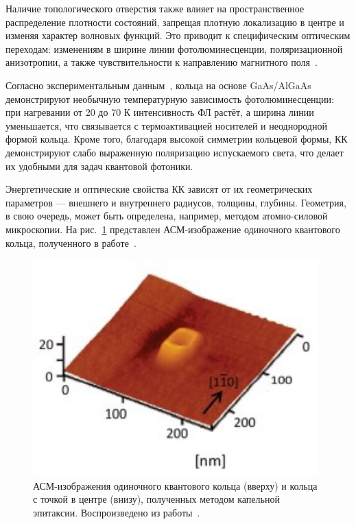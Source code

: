 \documentclass[14pt,oneside]{extarticle}
\begin{document}
Наличие топологического отверстия также влияет на пространственное распределение плотности состояний, запрещая плотную локализацию в центре и изменяя характер волновых функций. Это приводит к специфическим оптическим переходам: изменениям в ширине линии фотолюминесценции, поляризационной анизотропии, а также чувствительности к направлению магнитного поля~\cite{Beo2020}.

Согласно экспериментальным данным~\cite{sibirmovskiy2018}, кольца на основе GaAs/AlGaAs демонстрируют необычную температурную зависимость фотолюминесценции: при нагревании от 20 до 70 К интенсивность ФЛ растёт, а ширина линии уменьшается, что связывается с термоактивацией носителей и неоднородной формой кольца. Кроме того, благодаря высокой симметрии кольцевой формы, КК демонстрируют слабо выраженную поляризацию испускаемого света, что делает их удобными для задач квантовой фотоники.

Энергетические и оптические свойства КК зависят от их геометрических параметров — внешнего и внутреннего радиусов, толщины, глубины. Геометрия, в свою очередь, может быть определена, например, методом атомно-силовой микроскопии. На рис.~\ref{fig:elborg2} представлен АСМ-изображение одиночного квантового кольца, полученного в работе~\cite{elborg2017}.

\begin{figure}[H]
    \begin{center}
        \includegraphics[width=11cm]{images/elborg_fig2.png}
        \caption{\label{fig:elborg2}
            АСМ-изображения одиночного квантового кольца (вверху) и кольца с точкой в центре (внизу), полученных методом капельной эпитаксии. Воспроизведено из работы~\cite{elborg2017}.}
    \end{center}
\end{figure}
\end{document}
